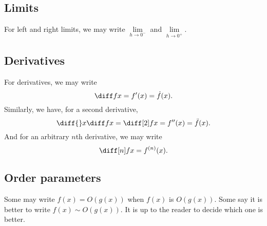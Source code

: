 \documentclass[12pt]{article}
\begin{document}
\subsection{Limits}

For left and right limits, we may write $\lim\limits_{h \to 0^{-}}$ and $\lim\limits_{h \to 0^{+}}.$ 

\subsection{Derivatives}

For derivatives, we may write
\[
    \diff f x = f'(x) = \dot f(x).
\]
Similarly, we have, for a second derivative,
\[
    \diff {}x \diff f x = \diff[2] f x = f''(x) = \ddot f(x).
\]
And for an arbitrary $n$th derivative, we may write
\[
    \diff[n] f x = f^{(n)}(x).
\]

\subsection{Order parameters}

Some may write $f(x) = O(g(x))$ when $f(x)$ is $O(g(x))$.
Some say it is better to write $f(x) \sim O(g(x))$.
It is up to the reader to decide which one is better.
\end{document}
